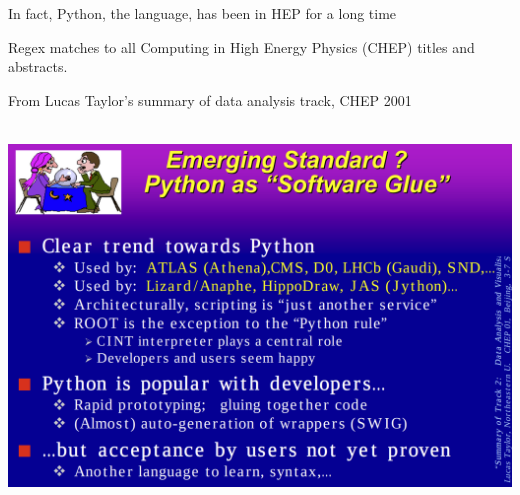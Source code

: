 \documentclass[aspectratio=169]{beamer}
\begin{document}
\begin{frame}{In fact, Python, the language, has been in HEP for a long time}
\vspace{0.25 cm}

Regex matches to all Computing in High Energy Physics (CHEP) titles and abstracts.

\vspace{-0.1 cm}
\begin{center}
\end{center}
\end{frame}

\begin{frame}{From Lucas Taylor's summary of data analysis track, CHEP 2001}
\vspace{0.25 cm}

\mbox{ } \hfill \includegraphics[width=0.82\linewidth]{PLOTS/chep-2001-python.png} \hfill \mbox{ }
\end{frame}
\end{document}

